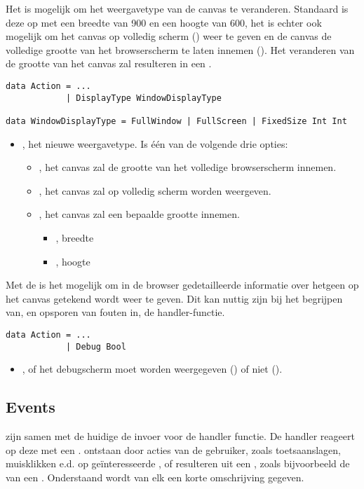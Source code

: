 Het is mogelijk om het weergavetype van de canvas te veranderen. Standaard is deze op  met een breedte van 900 en een hoogte van 600, het is echter ook mogelijk om het canvas op volledig scherm () weer te geven en de canvas de volledige grootte van het browserscherm te laten innemen (). Het veranderen van de grootte van het canvas zal resulteren in een  {\color{red} }.
\begin{lstlisting}
data Action = ...
			| DisplayType WindowDisplayType
			
data WindowDisplayType = FullWindow | FullScreen | FixedSize Int Int
\end{lstlisting}
\begin{itemize}
	\item {}, het nieuwe weergavetype. Is één van de volgende drie opties:
		\begin{itemize}
			\item {}, het canvas zal de grootte van het volledige browserscherm innemen.
			\item {}, het canvas zal op volledig scherm worden weergeven.
			\item {}, het canvas zal een bepaalde grootte innemen. 
				\begin{itemize}
					\item {}, breedte
					\item {}, hoogte
				\end{itemize}
		\end{itemize}
\end{itemize}

Met de  is het mogelijk om in de browser gedetailleerde informatie over hetgeen op het canvas getekend wordt weer te geven. Dit kan nuttig zijn bij het begrijpen van, en opsporen van fouten in, de handler-functie.
\begin{lstlisting}
data Action = ...
			| Debug Bool
\end{lstlisting}
\begin{itemize}
	\item {}, of het debugscherm moet worden weergegeven () of niet ().
\end{itemize}

\subsection{Events}
\events zijn samen met de huidige  de invoer voor de handler functie. De handler reageert op deze \events met een . \events ontstaan door acties van de gebruiker, zoals toetsaanslagen, muisklikken e.d. op geïnteresseerde \shapes, of resulteren uit een , zoals bijvoorbeeld de  van een .
Onderstaand wordt van elk  een korte omschrijving gegeven.

